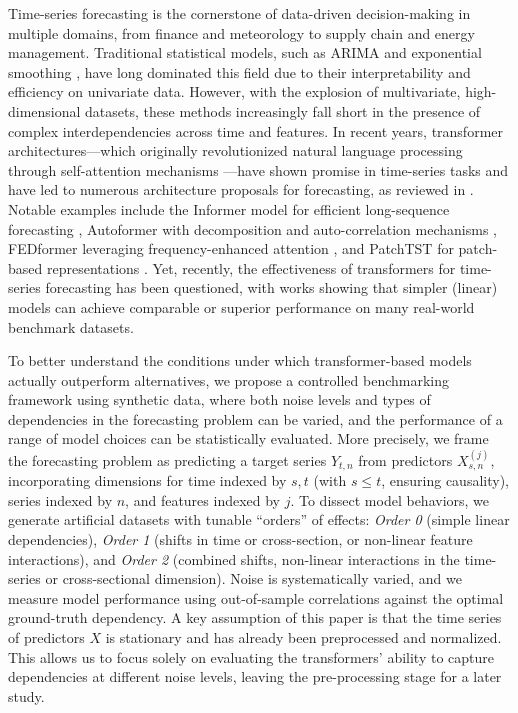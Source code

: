 \documentclass{article}
\begin{document}
Time-series forecasting is the cornerstone of data-driven decision-making in multiple domains, from finance and meteorology to supply chain and energy management. Traditional statistical models, such as ARIMA and exponential smoothing \cite{box2015time}, have long dominated this field due to their interpretability and efficiency on univariate data. However, with the explosion of multivariate, high-dimensional datasets, these methods increasingly fall short in the presence of complex interdependencies across time and features.
In recent years, transformer architectures—which originally revolutionized natural language processing through self-attention mechanisms \cite{vaswani2017attention}—have shown promise in time-series tasks and have led to numerous architecture proposals for forecasting, as reviewed in \cite{wen2023transformers}. Notable examples include the Informer model for efficient long-sequence forecasting \cite{zhou2021informer}, Autoformer with decomposition and auto-correlation mechanisms \cite{wu2021autoformer}, FEDformer leveraging frequency-enhanced attention \cite{zhou2022fedformer}, and PatchTST for patch-based representations \cite{nie2023time}. Yet, recently, the effectiveness of transformers for time-series forecasting has been questioned, with works showing that simpler (linear) models can achieve comparable or superior performance \cite{zeng2023transformers,das2023tide} on many real-world benchmark datasets.

To better understand the conditions under which transformer-based models actually outperform alternatives, we propose a controlled benchmarking framework using synthetic data, where both noise levels and types of dependencies in the forecasting problem can be varied, and the performance of a range of model choices can be statistically evaluated. More precisely, we frame the forecasting problem as predicting a target series $Y_{t,n}$ from predictors $X^{(j)}_{s,n}$, incorporating dimensions for time indexed by $s,t$ (with $s \leq t$, ensuring causality), series indexed by $n$, and features indexed by $j$. To dissect model behaviors, we generate artificial datasets with tunable ``orders'' of effects: \textit{Order 0} (simple linear dependencies), \textit{Order 1} (shifts in time or cross-section, or non-linear feature interactions), and \textit{Order 2} (combined shifts, non-linear interactions in the time-series or cross-sectional dimension). Noise is systematically varied, and we measure model performance using out-of-sample correlations against the optimal ground-truth dependency. A key assumption of this paper is that the time series of predictors $X$ is stationary and has already been preprocessed and normalized. This allows us to focus solely on evaluating the transformers' ability to capture dependencies at different noise levels, leaving the pre-processing stage for a later study.
\end{document}
